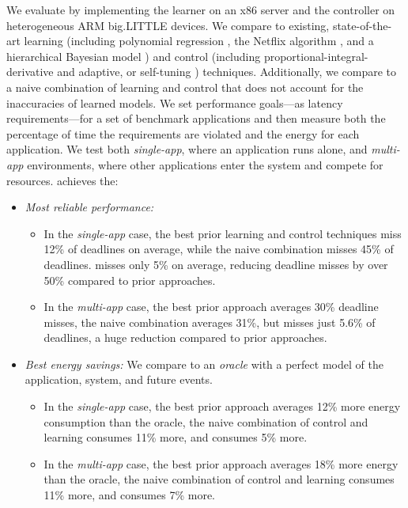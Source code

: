 We evaluate \SYSTEM{} by implementing the learner on an x86 server and
the controller on heterogeneous ARM big.LITTLE devices.  We compare
\SYSTEM{} to existing, state-of-the-art learning (including polynomial
regression \cite{Koala,dubach2010}, the Netflix algorithm
\cite{nuclear,Paragon}, and a hierarchical Bayesian model \cite{LEO})
and control (including proportional-integral-derivative
\cite{Hellerstein2004a} and adaptive, or self-tuning
\cite{ControlHandbook}) techniques.  Additionally, we compare to a
naive combination of learning and control that does not account for
the inaccuracies of learned models.  We set performance goals---as
latency requirements---for a set of benchmark applications and then
measure both the percentage of time the requirements are violated and
the energy for each application.  We test both \emph{single-app},
where an application runs alone, and \emph{multi-app} environments,
where other applications enter the system and compete for resources.
\SYSTEM{} achieves the:
\begin{itemize}[leftmargin=1em]
\item \textit{Most reliable performance:}
  \begin{itemize}[leftmargin=1em]
  \item In the \emph{single-app} case, the best prior learning and
    control techniques miss 12\% of deadlines on average, while the
    naive combination misses 45\% of deadlines. \SYSTEM{} misses only
    5\% on average, reducing deadline misses by over 50\% compared to
    prior approaches.
  \item In the \emph{multi-app} case, the best prior approach averages
    30\% deadline misses, the naive combination averages 31\%, but
    \SYSTEM{} misses just 5.6\% of deadlines, a huge reduction
    compared to prior approaches.
  \end{itemize}
\item \textit{Best energy savings:} We compare to an \emph{oracle}
  with a perfect model of the application, system, and future events.
  \begin{itemize}[leftmargin=1em]
  \item In the \emph{single-app} case, the best prior approach
    averages 12\% more energy consumption than the oracle, the naive
    combination of control and learning consumes 11\% more, and
    \SYSTEM{} consumes 5\% more.
  \item In the \emph{multi-app} case, the best prior approach averages
    18\% more energy than the oracle, the naive combination of control
    and learning consumes 11\% more, and \SYSTEM{} consumes 7\% more.
  \end{itemize}
\end{itemize}

